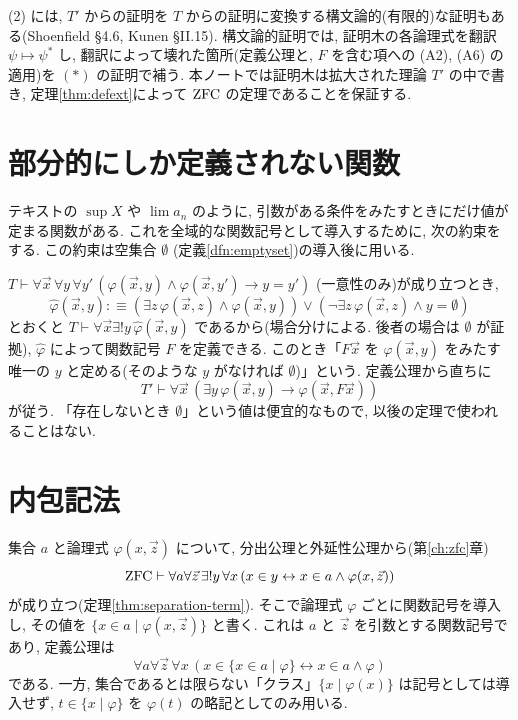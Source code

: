\begin{rem}
  (2) には, $T'$ からの証明を $T$ からの証明に変換する構文論的(有限的)な証明もある(Shoenfield \cite{shoenfield} \S 4.6, Kunen \cite{kunenFoM} \S II.15). 構文論的証明では, 証明木の各論理式を翻訳 $\psi \mapsto \psi^\ast$ し, 翻訳によって壊れた箇所(定義公理と, $F$ を含む項への (A2), (A6) の適用)を $(\ast)$ の証明で補う. 本ノートでは証明木は拡大された理論 $T'$ の中で書き, 定理\ref{thm:defext}によって $\mathrm{ZFC}$ の定理であることを保証する.
\end{rem}

\section{部分的にしか定義されない関数}

テキストの $\sup X$ や $\lim a_n$ のように, 引数がある条件をみたすときにだけ値が定まる関数がある. これを全域的な関数記号として導入するために, 次の約束をする. この約束は空集合 $\emptyset$ (定義\ref{dfn:emptyset})の導入後に用いる.

\begin{dfn}[記述による関数記号]\label{dfn:description}
  $T \vdash \forall \vec{x}\,\forall y\,\forall y'\,(\varphi(\vec x, y) \land \varphi(\vec x, y') \to y = y')$ (一意性のみ)が成り立つとき,
  \[ \hat\varphi(\vec x, y) :\equiv (\exists z\,\varphi(\vec x, z) \land \varphi(\vec x, y)) \lor (\neg\exists z\,\varphi(\vec x, z) \land y = \emptyset) \]
  とおくと $T \vdash \forall \vec x\exists ! y\,\hat\varphi(\vec x, y)$ であるから(場合分けによる. 後者の場合は $\emptyset$ が証拠), $\hat\varphi$ によって関数記号 $F$ を定義できる. このとき「$F\vec x$ を $\varphi(\vec x, y)$ をみたす唯一の $y$ と定める(そのような $y$ がなければ $\emptyset$)」という. 定義公理から直ちに
  \[ T' \vdash \forall \vec x\,(\exists y\,\varphi(\vec x, y) \to \varphi(\vec x, F\vec x)) \]
  が従う. 「存在しないとき $\emptyset$」という値は便宜的なもので, 以後の定理で使われることはない.
\end{dfn}

\section{内包記法}

集合 $a$ と論理式 $\varphi(x, \vec z)$ について, 分出公理と外延性公理から(第\ref{ch:zfc}章)
\[ \mathrm{ZFC} \vdash \forall a \forall \vec z\, \exists ! y\,\forall x\,(x \in y \leftrightarrow x \in a \land \varphi(x, \vec z)) \]
が成り立つ(定理\ref{thm:separation-term}). そこで論理式 $\varphi$ ごとに関数記号を導入し, その値を $\{x \in a \mid \varphi(x, \vec z)\}$ と書く. これは $a$ と $\vec z$ を引数とする関数記号であり, 定義公理は
\[ \forall a\forall \vec z\,\forall x\,(x \in \{x \in a \mid \varphi\} \leftrightarrow x \in a \land \varphi) \]
である. 一方, 集合であるとは限らない「クラス」$\{x \mid \varphi(x)\}$ は記号としては導入せず, $t \in \{x \mid \varphi\}$ を $\varphi(t)$ の略記としてのみ用いる.
